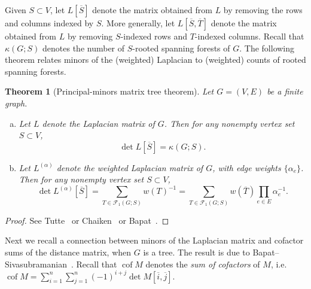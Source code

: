 \documentclass{amsart}
\newtheorem{thm}{Theorem}[section]
\theoremstyle{definition}
\newtheorem{dfn}[thm]{Definition}
\newcommand{\RR}{\mathbb{R}}
\newcommand{\La}{L^{(\alpha)}}
\DeclareMathOperator{\cof}{cof}
\newcommand{\trees}{\mathcal{F}_1}
\begin{document}

Given $S \subset V$,
let $L[\overline S]$ denote the matrix obtained from $L$ by removing the rows and columns indexed by $S$.
More generally, let $L[\overline S, \overline T]$ denote the matrix obtained from $L$ by removing $S$-indexed rows and $T$-indexed columns.
Recall that $\kappa(G; S)$ denotes the number of $S$-rooted spanning forests of $G$.
The following theorem relates minors of the (weighted) Laplacian to (weighted) counts of rooted spanning forests.
\begin{thm}[Principal-minors matrix tree theorem]
\label{thm:matrix-tree}
Let $G = (V,E)$ be a finite graph.
\begin{enumerate}[(a)]
\item 
Let $L$ denote the Laplacian matrix of $G$.
Then for any nonempty vertex set $S \subset V$,
\begin{equation}
	\det L[\overline S] = \kappa( G ; S) .
\end{equation}

\item 
Let $\La$ denote the weighted Laplacian matrix of $G$, with edge weights $\{\alpha_e\}$. 
Then for any nonempty vertex set $S \subset V$,
\begin{equation}
	\det \La[\overline S] = \sum_{T \in \trees( G ; S)} w(T)^{-1}
	= \sum_{T \in \trees(G; S)} w(\overline{T}) \prod_{e \in E} \alpha_e^{-1} .
\end{equation}
\end{enumerate}
\end{thm}
\begin{proof}
See Tutte~\cite[Section VI.6, Equation (VI.6.7)]{tutte} or Chaiken~\cite{chaiken} or Bapat~\cite[Theorem 4.7]{bapat}.
\end{proof}

Next we recall a connection between minors of the Laplacian matrix and cofactor sums of the distance matrix, when $G$ is a tree.
The result is due to Bapat--Sivasubramanian~\cite{bapat-sivasubramanian}.
Recall that $\cof M$ denotes the {\em sum of cofactors} of $M$, i.e. 
$\displaystyle
	\cof M = \sum_{i = 1}^{n} \sum_{j = 1}^{n} (-1)^{i + j} \det M[\overline{i},\overline{j}].
$
\end{document}
